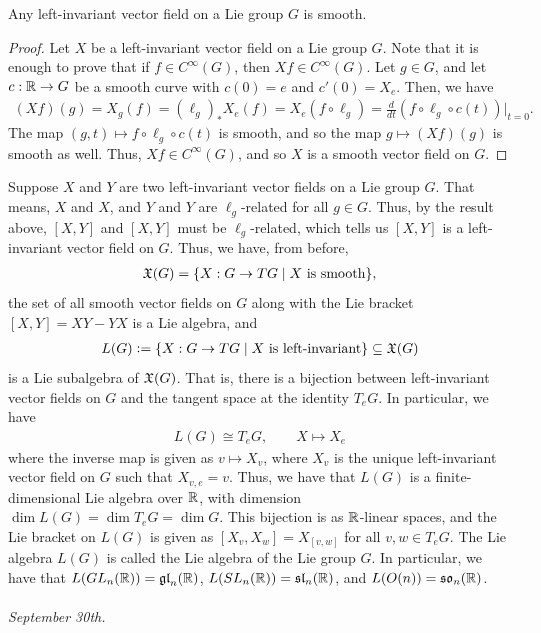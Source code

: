 \begin{proposition}
    Any left-invariant vector field on a Lie group $G$ is smooth.
\end{proposition}
\begin{proof}
    Let $X$ be a left-invariant vector field on a Lie group $G$. Note that it is enough to prove that if $f \in C^{\infty}(G)$, then $Xf \in C^{\infty}(G)$. Let $g \in G$, and let $c:\mathbb{R} \to G$ be a smooth curve with $c(0) = e$ and $c'(0) = X_{e}$. Then, we have
    \begin{align}
        (Xf)(g) = X_{g}(f) = (\ell_{g})_{\ast}X_{e}(f) = X_{e}(f \circ \ell_{g}) = \frac{d}{dt} (f \circ \ell_{g} \circ c(t))\bigg|_{t=0}.
    \end{align}
    The map $(g,t) \mapsto f \circ \ell_{g} \circ c(t)$ is smooth, and so the map $g \mapsto (Xf)(g)$ is smooth as well. Thus, $Xf \in C^{\infty}(G)$, and so $X$ is a smooth vector field on $G$.
\end{proof}

Suppose $X$ and $Y$ are two left-invariant vector fields on a Lie group $G$. That means, $X$ and $X$, and $Y$ and $Y$ are $\ell_{g}$-related for all $g \in G$. Thus, by the result above, $[X,Y]$ and $[X,Y]$ must be $\ell_{g}$-related, which tells us $[X,Y]$ is a left-invariant vector field on $G$. Thus, we have, from before,
\begin{align}
    \mathfrak{X}(G) = \{X:G \to TG \mid X \text{ is smooth}\},
\end{align}
the set of all smooth vector fields on $G$ along with the Lie bracket $[X,Y] = XY-YX$ is a Lie algebra, and
\begin{align}
    L(G) \vcentcolon= \{X:G \to TG \mid X \text{ is left-invariant}\} \subseteq \mathfrak{X}(G)
\end{align}
is a Lie subalgebra of $\mathfrak{X}(G)$. That is, there is a bijection between left-invariant vector fields on $G$ and the tangent space at the identity $T_{e}G$. In particular, we have
\begin{align}
    L(G) \cong T_{e}G, \qquad X \mapsto X_{e}
\end{align}
where the inverse map is given as $v \mapsto X_{v}$, where $X_{v}$ is the unique left-invariant vector field on $G$ such that $X_{v,e} = v$. Thus, we have that $L(G)$ is a finite-dimensional Lie algebra over $\mathbb{R}$, with dimension $\dim L(G) = \dim T_{e}G = \dim G$. This bijection is as $\mathbb{R}$-linear spaces, and the Lie bracket on $L(G)$ is given as $[X_{v},X_{w}] = X_{[v,w]}$ for all $v,w \in T_{e}G$. The Lie algebra $L(G)$ is called the Lie algebra of the Lie group $G$. In particular, we have that $L(GL_{n}(\mathbb{R})) = \mathfrak{gl}_{n}(\mathbb{R})$, $L(SL_{n}(\mathbb{R})) = \mathfrak{sl}_{n}(\mathbb{R})$, and $L(O(n)) = \mathfrak{so}_{n}(\mathbb{R})$.
\\ \\
\textit{September 30th.}

